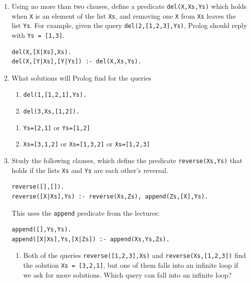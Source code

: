 \documentclass{article}
\begin{document}
\begin{enumerate}
\item
Using no more than two clauses, define a predicate \verb!del(X,Xs,Ys)!
which holds when \verb!X! is an element of the list \verb!Xs!, and
removing one \verb!X! from \verb!Xs! leaves the list \verb!Ys!. For
example, given the query \verb!del(2,[1,2,3],Ys)!, Prolog should reply
with \verb!Ys = [1,3]!.

\begin{verbatim}
del(X,[X|Xs],Xs).
del(X,[Y|Xs],[Y|Ys]) :- del(X,Xs,Ys).
\end{verbatim}

\item
What solutions will Prolog find for the queries

\noindent
\begin{minipage}{0.35\textwidth}
  \begin{enumerate}
  \item
  \verb!del(1,[1,2,1],Ys).!
  \item
  \verb!del(3,Xs,[1,2]).!
  \end{enumerate}
\end{minipage}
\begin{minipage}{0.65\textwidth}
  \begin{enumerate}
  \item
  \verb!Ys=[2,1]! or \verb!Ys=[1,2]!
  \item
  \verb!Xs=[3,1,2]! or \verb!Xs=[1,3,2]! or \verb!Xs=[1,2,3]!
  \end{enumerate}
\end{minipage}

\item
Study the following clauses, which define the predicate
\verb!reverse(Xs,Ys)! that holds if the lists \verb!Xs! and
\verb!Ys! are each other's reversal.  
\begin{verbatim}
reverse([],[]).
reverse([X|Xs],Ys) :- reverse(Xs,Zs), append(Zs,[X],Ys).
\end{verbatim}
This uses the \verb!append! predicate from the lectures:
\begin{verbatim}
append([],Ys,Ys).
append([X|Xs],Ys,[X|Zs]) :- append(Xs,Ys,Zs).
\end{verbatim}
\begin{enumerate}
\item
Both of the queries \verb!reverse([1,2,3],Xs)! and
\verb!reverse(Xs,[1,2,3])! find the solution \verb!Xs = [3,2,1]!, but
one of them falls into an infinite loop if we ask for more
solutions. Which query can fall into an infinite loop?


\end{enumerate}
\end{enumerate}
\end{document}
